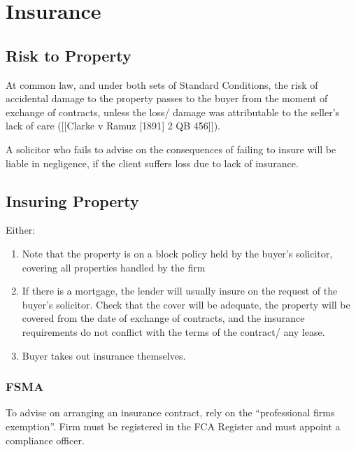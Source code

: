 \documentclass[
]{article}
\providecommand{\tightlist}{%
  \setlength{\itemsep}{0pt}\setlength{\parskip}{0pt}}
\begin{document}
\hypertarget{insurance-1}{%
\section{Insurance}\label{insurance-1}}

\hypertarget{risk-to-property}{%
\subsection{Risk to Property}\label{risk-to-property}}

At common law, and under both sets of Standard Conditions, the risk of
accidental damage to the property passes to the buyer from the moment of
exchange of contracts, unless the loss/ damage was attributable to the
seller's lack of care ({[}{[}Clarke v Ramuz {[}1891{]} 2 QB 456{]}{]}).

A solicitor who fails to advise on the consequences of failing to insure
will be liable in negligence, if the client suffers loss due to lack of
insurance.

\hypertarget{insuring-property}{%
\subsection{Insuring Property}\label{insuring-property}}

Either:

\begin{enumerate}
\def\labelenumi{\arabic{enumi}.}
\tightlist
\item
  Note that the property is on a block policy held by the buyer's
  solicitor, covering all properties handled by the firm
\item
  If there is a mortgage, the lender will usually insure on the request
  of the buyer's solicitor. Check that the cover will be adequate, the
  property will be covered from the date of exchange of contracts, and
  the insurance requirements do not conflict with the terms of the
  contract/ any lease.
\item
  Buyer takes out insurance themselves.
\end{enumerate}

\hypertarget{fsma}{%
\subsubsection{FSMA}\label{fsma}}

To advise on arranging an insurance contract, rely on the ``professional
firms exemption''. Firm must be registered in the FCA Register and must
appoint a compliance officer.
\end{document}
